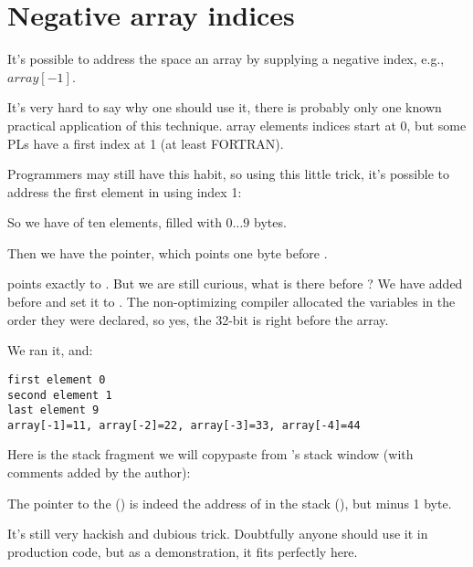 \chapter{Negative array indices}
\label{negative_array_indices}

It's possible to address the space  an array by supplying a negative index, e.g., $array[-1]$.

It's very hard to say why one should use it, there is probably only one known practical application
of this technique.
\CCpp array elements indices start at 0, but some \ac{PL}s have a first index at 1 
(at least FORTRAN).

Programmers may still have this habit, so using this little trick, it's possible to address the first element
in \CCpp using index 1:





So we have  of ten elements, filled with $0 \ldots 9$ bytes.

Then we have the  pointer, which points one byte before .

 points exactly to .
But we are still curious, what is there before ?
We have added  before  and set 
it to .
The non-optimizing compiler allocated the variables in the order they were declared, so yes, the 32-bit 
is right before the array.

We ran it, and:

\begin{lstlisting}
first element 0
second element 1
last element 9
array[-1]=11, array[-2]=22, array[-3]=33, array[-4]=44
\end{lstlisting}

Here is the stack fragment we will copypaste from \olly's stack window (with comments added by the author):



The pointer to the  () is indeed 
the address of  in the stack (), 
but minus 1 byte.

It's still very hackish and dubious trick. Doubtfully anyone should use it in production code,
but as a demonstration, it fits perfectly here.


